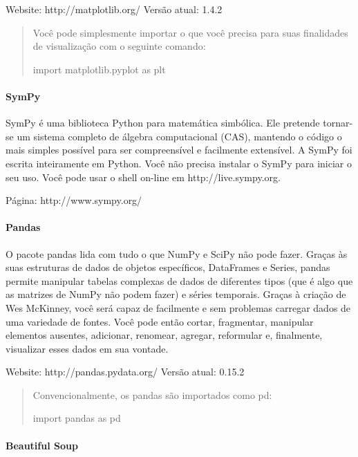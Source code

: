 \documentclass[11pt]{article}
\begin{document}
Website: http://matplotlib.org/ Versão atual: 1.4.2

\begin{quote}
Você pode simplesmente importar o que você precisa para suas finalidades
de visualização com o seguinte comando:

import matplotlib.pyplot as plt
\end{quote}

\paragraph{SymPy}\label{sympy}

SymPy é uma biblioteca Python para matemática simbólica. Ele pretende
tornar-se um sistema completo de álgebra computacional (CAS), mantendo o
código o mais simples possível para ser compreensível e facilmente
extensível. A SymPy foi escrita inteiramente em Python. Você não precisa
instalar o SymPy para iniciar o seu uso. Você pode usar o shell on-line
em http://live.sympy.org.

Página: http://www.sympy.org/

\paragraph{Pandas }\label{pandas}

O pacote pandas lida com tudo o que NumPy e SciPy não pode fazer. Graças
às suas estruturas de dados de objetos específicos, DataFrames e Series,
pandas permite manipular tabelas complexas de dados de diferentes tipos
(que é algo que as matrizes de NumPy não podem fazer) e séries
temporais. Graças à criação de Wes McKinney, você será capaz de
facilmente e sem problemas carregar dados de uma variedade de fontes.
Você pode então cortar, fragmentar, manipular elementos ausentes,
adicionar, renomear, agregar, reformular e, finalmente, visualizar esses
dados em sua vontade.

Website: http://pandas.pydata.org/ Versão atual: 0.15.2

\begin{quote}
Convencionalmente, os pandas são importados como pd:

import pandas as pd
\end{quote}

\paragraph{Beautiful Soup }\label{beautiful-soup}
\end{document}
